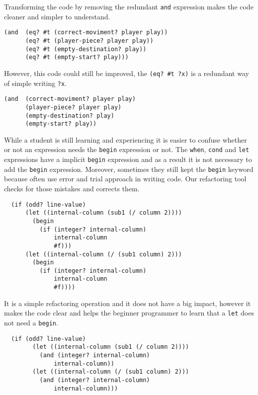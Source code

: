 Transforming the code by removing the redundant {\tt and} expression makes the code
cleaner and simpler to understand.
\begin{lstlisting}
(and  (eq? #t (correct-moviment? player play))
      (eq? #t (player-piece? player play))
      (eq? #t (empty-destination? play))
      (eq? #t (empty-start? play)))
\end{lstlisting}

However, this code could still be improved, the {\tt (eq? \#t ?x)} is a redundant way
of simple writing {\tt ?x}.
\begin{lstlisting}
(and  (correct-moviment? player play)
      (player-piece? player play)
      (empty-destination? play)
      (empty-start? play))
\end{lstlisting}


While a student is still learning and experiencing it is easier to confuse whether
or not an expression needs the {\tt begin} expression or not.
The {\tt when}, {\tt cond} and {\tt let} expressions have a implicit {\tt begin} expression and
as a result it is not necessary to add the {\tt begin} expression.
Moreover, sometimes they still kept the {\tt begin} keyword because often use error and trial approach
in writing code.
Our refactoring tool checks for those mistakes and corrects them.
\begin{lstlisting}
  (if (odd? line-value)
      (let ((internal-column (sub1 (/ column 2))))
        (begin
          (if (integer? internal-column)
              internal-column
              #f)))
      (let ((internal-column (/ (sub1 column) 2)))
        (begin
          (if (integer? internal-column)
              internal-column
              #f))))
\end{lstlisting}
It is a simple refactoring operation and it does not have a big impact, however
it makes the code clear and helps the beginner programmer to learn that a {\tt let}
does not need a {\tt begin}.
\begin{lstlisting}
  (if (odd? line-value)
        (let ((internal-column (sub1 (/ column 2))))
          (and (integer? internal-column)
              internal-column))
        (let ((internal-column (/ (sub1 column) 2)))
          (and (integer? internal-column)
              internal-column)))
\end{lstlisting}


